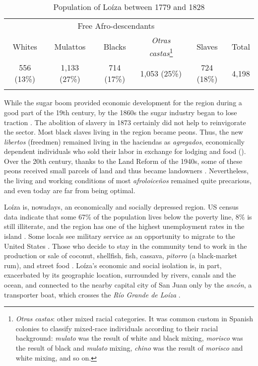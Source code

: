 \documentclass[output=paper,colorlinks,citecolor=brown]{langscibook}
\begin{document}
\begin{table}

\begin{tabular}{cccccc}
\lsptoprule
          & \multicolumn{3}{c}{{Free Afro-descendants}} & \\\cmidrule(lr){2-4}
   {Whites}  & {Mulattos} & {Blacks} & {{\textit{Otras castas}}\footnote{\textit{Otras castas}: other mixed racial categories. It was common custom in Spanish colonies to classify mixed-race individuals according to their racial background: \textit{mulato} was the result of white and black mixing, \textit{morisco} was the result of black and \textit{mulato} mixing,  \textit{chino} was the result of  \textit{morisco} and white mixing, and so on.}} & Slaves & {Total} \\\midrule
556 (13\%) & 1,133 (27\%) & 714 (17\%) & 1,053 (25\%) & 724 (18\%) & {4,198}\\
\lspbottomrule
\end{tabular}
\caption{Population of Loíza between 1779 and 1828\label{tab:visconti:11}}
\end{table}

While the sugar boom provided economic development for the region during a good part of the 19th century, by the 1860s the sugar industry began to lose traction \citep{Picó1986}. The abolition of slavery in 1873 certainly did not help to reinvigorate the sector. Most black slaves living in the region became peons. Thus, the new \textit{libertos} (freedmen) remained living in the haciendas as \textit{agregados}, economically dependent individuals who sold their labor in exchange for lodging and food (\citealt{Meriño_perera2009}). Over the 20th century, thanks to the Land Reform of the 1940s, some of these peons received small parcels of land and thus became landowners \citep{Stahl1966}. Nevertheless, the living and working conditions of most \textit{afroloiceños} remained quite precarious, and even today are far from being optimal.

Loíza is, nowadays, an economically and socially depressed region. US census data indicate that some 67\% of the population lives below the poverty line, 8\% is still illiterate, and the region has one of the highest unemployment rates in the island \citep[47--49]{Ungerleider2000}. Some locals see military service as an opportunity to migrate to the United States \citep{Aramburu2012}. Those who decide to stay in the community tend to work in the production or sale of coconut, shellfish, fish, cassava, \textit{pitorro} (a black-market rum), and street food \citep[44--45]{Ungerleider2000}. Loíza’s economic and social isolation is, in part, exacerbated by its geographic location, surrounded by rivers, canals and the ocean, and connected to the nearby capital city of San Juan only by the \textit{ancón}, a transporter boat, which crosses the \textit{Río Grande de Loí}\textit{za} \citep[44]{Ungerleider2000}. 
\end{document}
